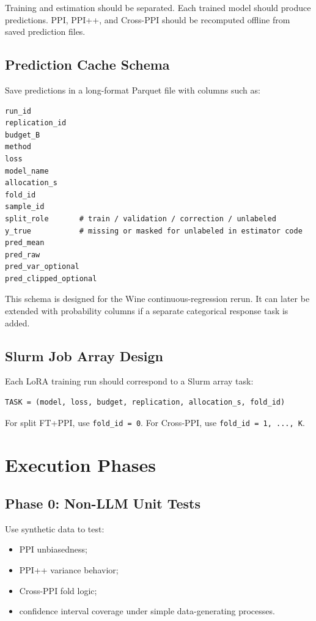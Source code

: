 \documentclass[11pt]{article}
\begin{document}
Training and estimation should be separated. Each trained model should produce predictions. PPI, PPI++, and Cross-PPI should be recomputed offline from saved prediction files.

\subsection{Prediction Cache Schema}

Save predictions in a long-format Parquet file with columns such as:

\begin{lstlisting}
run_id
replication_id
budget_B
method
loss
model_name
allocation_s
fold_id
sample_id
split_role       # train / validation / correction / unlabeled
y_true           # missing or masked for unlabeled in estimator code
pred_mean
pred_raw
pred_var_optional
pred_clipped_optional
\end{lstlisting}

This schema is designed for the Wine continuous-regression rerun. It can later be extended with probability columns if a separate categorical response task is added.

\subsection{Slurm Job Array Design}

Each LoRA training run should correspond to a Slurm array task:

\begin{lstlisting}
TASK = (model, loss, budget, replication, allocation_s, fold_id)
\end{lstlisting}

For split FT+PPI, use \texttt{fold\_id = 0}. For Cross-PPI, use \texttt{fold\_id = 1, ..., K}.

\section{Execution Phases}

\subsection{Phase 0: Non-LLM Unit Tests}

Use synthetic data to test:

\begin{itemize}
    \item PPI unbiasedness;
    \item PPI++ variance behavior;
    \item Cross-PPI fold logic;
    \item confidence interval coverage under simple data-generating processes.
\end{itemize}
\end{document}
